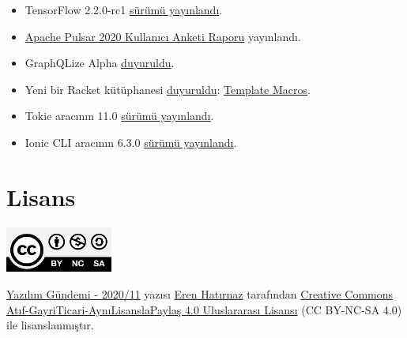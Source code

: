 \documentclass[11pt]{article}
\begin{document}
\begin{itemize}
\item TensorFlow 2.2.0-rc1 \href{https://github.com/tensorflow/tensorflow/releases/tag/v2.2.0-rc1}{sürümü yayınlandı}.
\item \href{https://streamnative.io/blog/tech/2020-03-17-announcing-the-apache-pulsar-2020-user-survey-report/}{Apache Pulsar 2020 Kullanıcı Anketi Raporu} yayınlandı.
\item GraphQLize Alpha \href{https://www.graphqlize.org/blog/announcing-graphqlize-alpha/}{duyuruldu}.
\item Yeni bir Racket kütüphanesi \href{https://dedbox.github.io/2020/03/template-macros-initial-release.html}{duyuruldu}: \href{https://github.com/dedbox/racket-template}{Template Macros}.
\item Tokie aracının 11.0 \href{https://github.com/XAMPPRocky/tokei/releases/tag/v11.0.0}{sürümü yayınlandı}.
\item Ionic CLI aracının 6.3.0 \href{https://github.com/ionic-team/ionic-cli/releases/tag/\%2540ionic\%252Fcli\%25406.3.0}{sürümü yayınlandı}.
\end{itemize}
\section{Lisans}
\label{sec:org55f6eaf}
\begin{center}
\begin{center}
\includegraphics[height=1.5cm]{../../../img/CC_BY-NC-SA_4.0.png}
\end{center}

\href{yazilim-gundemi-2020-11.pdf}{Yazılım Gündemi - 2020/11} yazısı \href{https://erenhatirnaz.github.io}{Eren Hatırnaz} tarafından \href{http://creativecommons.org/licenses/by-nc-sa/4.0/}{Creative Commons
Atıf-GayriTicari-AynıLisanslaPaylaş 4.0 Uluslararası Lisansı} (CC BY-NC-SA 4.0)
ile lisanslanmıştır.
\end{center}
\end{document}
